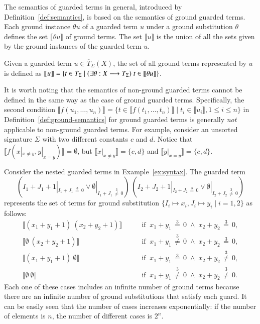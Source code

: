 The semantics of guarded terms in general, introduced by
Definition~\ref{def:semantics}, is based on the semantics of ground
guarded terms.  Each ground instance $\theta u$ of a guarded term $u$
under a ground substitution $\theta$ defines the set $\llbracket
\theta u \rrbracket$ of ground terms.  The set $\llbracket u
\rrbracket$ is the union of all the sets given by the ground instances
of the guarded term $u$.

\begin{definition}\label{def:semantics}
Given a guarded term $u \in \overline{T}_{\Sigma}(X)$, the set of all
ground terms represented by $u$ is defined as $\llbracket u \rrbracket
= \{t \in T_\Sigma \mid (\exists \theta : X \longrightarrow T_\Sigma)\; t \in
\llbracket \theta u \rrbracket \}$.
\end{definition}


It is worth noting that the semantics of non-ground guarded terms
cannot be defined in the same way as the case of ground guarded terms.
Specifically, the second condition $\llbracket f(u_1,\ldots,u_n) \rrbracket = \{t \in
\llbracket f(t_1,\ldots,t_n)\rrbracket \mid t_i \in \llbracket
u_i\rrbracket, 1 \leq i \leq n \}$ in
Definition~\ref{def:ground-semantics} for ground guarded terms is
generally \emph{not} applicable to non-ground guarded terms.
For example, 
consider an unsorted signature $\Sigma$ with two
different constants $c$ and $d$.  
%
Notice that $\llbracket f(x |_{x \neq y}, y |_{x = y})\rrbracket =
\emptyset$, but $\llbracket x |_{x \neq y} \rrbracket = \{c,d\}$ and
$\llbracket y |_{x = y} \rrbracket = \{c, d\}$.


\begin{example}\label{ex:semantics}
Consider the nested guarded terms in Example~\ref{ex:syntax}. The guarded term
\[(I_1 + J_1 + 1 |_{I_1 + J_1 \,\stackrel{3}{=}\, 0} \vee \emptyset |_{I_1 + J_1 \,\stackrel{3}{\not=}\, 0})\ (I_2 + J_2 + 1 |_{I_2 + J_2 \,\stackrel{3}{=}\, 0} \vee \emptyset |_{I_2 + J_2 \,\stackrel{3}{\not=}\, 0})\]
represents the set of terms for ground substitution $\{I_i \mapsto
x_i, J_i \mapsto y_i \mid i = 1, 2\}$ as follows:
%
\begin{align*}
\llbracket (x_1 + y_1 +1)\ (x_2 + y_2 + 1) \rrbracket &\qquad\mbox{if}\;\; x_1 + y_1 \,\stackrel{3}{=}\, 0 \;\wedge\; x_2 + y_2 \,\stackrel{3}{=}\, 0,\\
\llbracket \emptyset\ (x_2 + y_2 + 1) \rrbracket &\qquad\mbox{if}\;\; x_1 + y_1 \,\stackrel{3}{\not=}\, 0 \;\wedge\; x_2 + y_2 \,\stackrel{3}{=}\, 0,\\
\llbracket (x_1 + y_1 +1)\ \emptyset \rrbracket &\qquad\mbox{if}\;\; x_1 + y_1 \,\stackrel{3}{=}\, 0 \;\wedge\; x_2 + y_2 \,\stackrel{3}{\not=}\, 0,\\
\llbracket \emptyset\ \emptyset \rrbracket &\qquad\mbox{if}\;\; x_1 + y_1 \,\stackrel{3}{\not=}\, 0 \;\wedge\; x_2 + y_2 \,\stackrel{3}{\not =}\, 0.
\end{align*}
%
Each one of these cases includes an infinite number of ground terms
because there are an infinite number of ground substitutions that
satisfy each guard. It can be easily seen that the number of cases
increases exponentially: if the number of elements is $n$, the number
of different cases is $2^n$.
\end{example}



